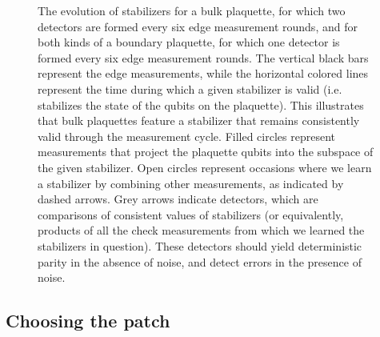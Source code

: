 \documentclass[onecolumn,a4paper,accepted=2022-09-12]{quantumarticle}
\theoremstyle{definition}
\theoremstyle{definition}
\theoremstyle{definition}
\begin{document}
\begin{figure}[ht!]
    \centering
    \caption{
    The evolution of stabilizers for a bulk plaquette, for which two detectors are formed every six edge measurement rounds, and for both kinds of a boundary plaquette, for which one detector is formed every six edge measurement rounds.  The vertical black bars represent the edge measurements, while the horizontal colored lines represent the time during which a given stabilizer is valid (i.e. stabilizes the state of the qubits on the plaquette).  This illustrates that bulk plaquettes feature a stabilizer that remains consistently valid through the measurement cycle. Filled circles represent measurements that project the plaquette qubits into the subspace of the given stabilizer.  Open circles represent occasions where we learn a stabilizer by combining other measurements, as indicated by dashed arrows. Grey arrows indicate detectors, which are comparisons of consistent values of stabilizers (or equivalently, products of all the check measurements from which we learned the stabilizers in question). These detectors should yield deterministic parity in the absence of noise, and detect errors in the presence of noise.
    }
    \label{fig:detectors}
\end{figure}

\subsection{Choosing the patch}
\label{sec:patches}
\end{document}

